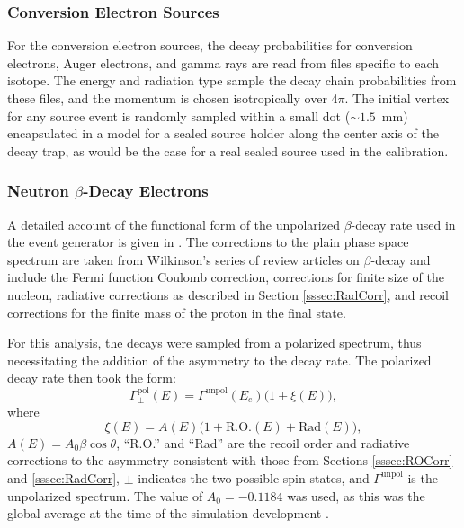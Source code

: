 \subsubsection{Conversion Electron Sources}
For the conversion electron sources, the decay probabilities for conversion electrons,
Auger electrons, and gamma rays are read from files specific to each isotope.
The energy and radiation type sample the decay chain probabilities from these files, and
the momentum is chosen isotropically over 4$\pi$. The initial vertex for any source
event is randomly sampled within a small dot ($\sim1.5$~mm) encapsulated in a model for a sealed source holder
along the center axis of the decay trap, as would be the case for a real sealed
source used in the calibration.

\subsubsection{Neutron $\beta$-Decay Electrons} \label{sssec:betaSim}

A detailed account of the functional form of the unpolarized $\beta$-decay rate used in the
event generator
is given in \cite{mpmThesis}. The corrections to the plain phase space spectrum are taken from
Wilkinson's series of review articles on $\beta$-decay
\cite{wilkinson1982,wilkinson1989evaluation,wilkinson1990evaluation,wilkinson1993evaluation,
  wilkinson1995evaluation,wilkinson1997evaluation,wilkinson1998evaluation} and include
the Fermi function Coulomb correction, corrections for finite size of the nucleon, radiative
corrections as described in Section \ref{sssec:RadCorr}, and recoil corrections for the finite
mass of the proton in the final state.

For this analysis, the decays were sampled from a polarized spectrum, thus necessitating the
addition of the asymmetry to the decay rate. The polarized decay rate then took the form:
\begin{equation}
  \Gamma^{\mathrm{pol}}_\pm(E) = \Gamma^{\mathrm{unpol}}(E_e) \bigg( 1 \pm \xi(E) \bigg),
\end{equation}
where
\begin{equation}
  \xi(E) = A(E)\Big(1+\mathrm{R.O.}(E)+\mathrm{Rad}(E)\Big),
\end{equation}
$A(E)=A_0\beta \cos\theta$, ``R.O.'' and ``Rad'' are the recoil order and radiative corrections to the asymmetry
consistent with those from Sections \ref{sssec:ROCorr} and \ref{sssec:RadCorr}, $\pm$ indicates the two possible spin states,
and $\Gamma^{\mathrm{unpol}}$ is the unpolarized
spectrum. The value of $A_0= -0.1184$ was used, as this was the global average at the time of the simulation
development \cite{pdg}.


